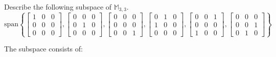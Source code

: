 \documentclass{ximera}
\author{}
\begin{document}
\begin{exercise}
Describe the following subspace of $\mathbb{M}_{3,3}$.
$$\text{span}\left\{\begin{bmatrix}1 & 0 & 0\\0 & 0 & 0\\0 & 0 & 0\end{bmatrix},\begin{bmatrix}0 & 0 & 0\\0 & 1 & 0\\0 & 0 & 0\end{bmatrix}, \begin{bmatrix}0 & 0 & 0\\0 & 0 & 0\\0 & 0 & 1\end{bmatrix}, \begin{bmatrix}0 & 1 & 0\\1 & 0 & 0\\0 & 0 & 0\end{bmatrix}, \begin{bmatrix}0 & 0 & 1\\0 & 0 & 0\\1 & 0 & 0\end{bmatrix}, \begin{bmatrix}0 & 0 & 0\\0 & 0 & 1\\0 & 1 & 0\end{bmatrix}\right\}$$

The subspace consists of:
 \begin{multipleChoice}
 \end{multipleChoice}

 \end{exercise}
\end{document}
